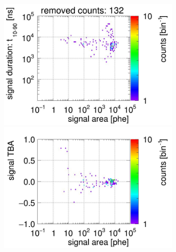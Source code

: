 \begin{landscape}
\begin{figure}[!p]
\begin{subfigure}[t]{0.32\textwidth}
			\includegraphics[width=\figurewidth,clip,trim={0 98 0 15}]{Figures/GasTest/CutsValid/res64767/pdpaX09Vecfig64767.jpg}
			\includegraphics[width=\figurewidth,clip,trim={0 8 0 40}]{Figures/GasTest/CutsValid/res64767/tbapaX09Vecfig64767.jpg}
			\caption{}
			\label{fig:signal selection 09}
		\end{subfigure}
		\begin{subfigure}[t]{0.32\textwidth}
			\centering

\end{subfigure}
\end{figure}
\end{landscape}
